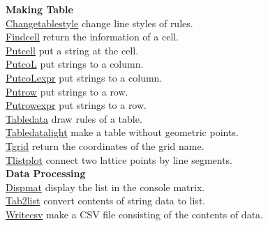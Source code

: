 \documentclass[papersize,a4paper,12pt]{article}
\begin{document}
\begin{tabbing}
{\bf Making Table} \> \\
\hyperlink{changetablestyle}{Changetablestyle} \> change line styles of rules.\\
\hyperlink{findcell}{Findcell} \> return the information of a cell.\\
\hyperlink{putcell}{Putcell} \> put a string at the cell.\\
\hyperlink{putcoL}{PutcoL} \> put strings to a column.\\
\hyperlink{putcoLexpr}{PutcoLexpr} \> put strings to a column.\\
\hyperlink{putrow}{Putrow} \> put strings to a row.\\
\hyperlink{putrowexpr}{Putrowexpr} \> put strings to a row.\\
\hyperlink{tabledata}{Tabledata} \> draw rules of a table.\\
\hyperlink{tabledatalight}{Tabledatalight} \> make a table without geometric points.\\
\hyperlink{tgrid}{Tgrid} \> return the coordinates of the grid name.\\
\hyperlink{tlistplot}{Tlistplot} \> connect two lattice points by line segments.\\

{\bf Data Processing}\\
\hyperlink{dispmat}{Dispmat} \> display the list in the console matrix.\\
\hyperlink{tab2list}{Tab2list} \> convert contents of string data to list.\\
\hyperlink{writecsv}{Writecsv} \> make a CSV file consisting of the contents of data.\\


\end{tabbing}
\end{document}
